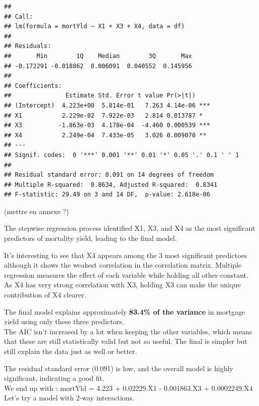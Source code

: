 \documentclass[
  11pt,
]{article}
\begin{document}
\begin{verbatim}
## 
## Call:
## lm(formula = mortYld ~ X1 + X3 + X4, data = df)
## 
## Residuals:
##       Min        1Q    Median        3Q       Max 
## -0.172291 -0.018862  0.006091  0.040552  0.145956 
## 
## Coefficients:
##               Estimate Std. Error t value Pr(>|t|)    
## (Intercept)  4.223e+00  5.814e-01   7.263 4.14e-06 ***
## X1           2.229e-02  7.922e-03   2.814 0.013787 *  
## X3          -1.863e-03  4.178e-04  -4.460 0.000539 ***
## X4           2.249e-04  7.433e-05   3.026 0.009070 ** 
## ---
## Signif. codes:  0 '***' 0.001 '**' 0.01 '*' 0.05 '.' 0.1 ' ' 1
## 
## Residual standard error: 0.091 on 14 degrees of freedom
## Multiple R-squared:  0.8634, Adjusted R-squared:  0.8341 
## F-statistic: 29.49 on 3 and 14 DF,  p-value: 2.618e-06
\end{verbatim}

(mettre en annexe ?)

The stepwise regression process identified X1, X3, and X4 as the most
significant predictors of mortality yield, leading to the final model.

It's interesting to see that X4 appears among the 3 most significant
predictoes although it shows the weakest correlation in the correlation
matrix. Multiple regression measures the effect of each variable while
holding all other constant. As X4 has very strong correlation with X3,
holding X3 can make the unique contribution of X4 clearer.

The final model explains approximately \textbf{83.4\% of the variance}
in mortgage yield using only these three predictors.\\
The AIC isn't increased by a lot when keeping the other variables, which
means that these are still statistically valid but not so useful. The
final is simpler but still explain the data just as well or better.

The residual standard error (0.091) is low, and the overall model is
highly significant, indicating a good fit.\\
We end up with : mortYld = 4.223 + 0.02229.X1 - 0.001863.X3 +
0.0002249.X4\\

Let's try a model with 2-way interactions.
\end{document}
